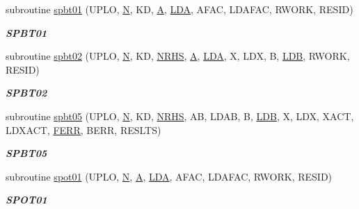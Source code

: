 \begin{DoxyCompactItemize}
subroutine \hyperlink{group__single__lin_ga08c51eb14516976c32e1ef2961535fbf}{spbt01} (U\+P\+L\+O, \hyperlink{polmisc_8c_a0240ac851181b84ac374872dc5434ee4}{N}, K\+D, \hyperlink{classA}{A}, \hyperlink{example__user_8c_ae946da542ce0db94dced19b2ecefd1aa}{L\+D\+A}, A\+F\+A\+C, L\+D\+A\+F\+A\+C, R\+W\+O\+R\+K, R\+E\+S\+I\+D)
\begin{DoxyCompactList}\small\item\em {\bfseries S\+P\+B\+T01} \end{DoxyCompactList}\item 
subroutine \hyperlink{group__single__lin_ga05bf2378300e8e903afc1183634b75df}{spbt02} (U\+P\+L\+O, \hyperlink{polmisc_8c_a0240ac851181b84ac374872dc5434ee4}{N}, K\+D, \hyperlink{example__user_8c_aa0138da002ce2a90360df2f521eb3198}{N\+R\+H\+S}, \hyperlink{classA}{A}, \hyperlink{example__user_8c_ae946da542ce0db94dced19b2ecefd1aa}{L\+D\+A}, X, L\+D\+X, B, \hyperlink{example__user_8c_a50e90a7104df172b5a89a06c47fcca04}{L\+D\+B}, R\+W\+O\+R\+K, R\+E\+S\+I\+D)
\begin{DoxyCompactList}\small\item\em {\bfseries S\+P\+B\+T02} \end{DoxyCompactList}\item 
subroutine \hyperlink{group__single__lin_gaf21d9aba38f48c36b8722d6b44d38edf}{spbt05} (U\+P\+L\+O, \hyperlink{polmisc_8c_a0240ac851181b84ac374872dc5434ee4}{N}, K\+D, \hyperlink{example__user_8c_aa0138da002ce2a90360df2f521eb3198}{N\+R\+H\+S}, A\+B, L\+D\+A\+B, B, \hyperlink{example__user_8c_a50e90a7104df172b5a89a06c47fcca04}{L\+D\+B}, X, L\+D\+X, X\+A\+C\+T, L\+D\+X\+A\+C\+T, \hyperlink{superlu__enum__consts_8h_af00a42ecad444bbda75cde1b64bd7e72a78fd14d7abebae04095cfbe02928f153}{F\+E\+R\+R}, B\+E\+R\+R, R\+E\+S\+L\+T\+S)
\begin{DoxyCompactList}\small\item\em {\bfseries S\+P\+B\+T05} \end{DoxyCompactList}\item 
subroutine \hyperlink{group__single__lin_ga1dbca454e3ec45506f2f435e34b5960f}{spot01} (U\+P\+L\+O, \hyperlink{polmisc_8c_a0240ac851181b84ac374872dc5434ee4}{N}, \hyperlink{classA}{A}, \hyperlink{example__user_8c_ae946da542ce0db94dced19b2ecefd1aa}{L\+D\+A}, A\+F\+A\+C, L\+D\+A\+F\+A\+C, R\+W\+O\+R\+K, R\+E\+S\+I\+D)
\begin{DoxyCompactList}\small\item\em {\bfseries S\+P\+O\+T01} \end{DoxyCompactList}\item 

\end{DoxyCompactItemize}
